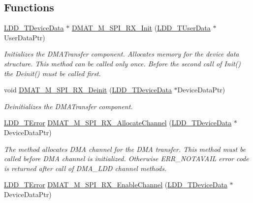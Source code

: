 \subsection*{Functions}
\begin{DoxyCompactItemize}
\item 
\hyperlink{group___p_e___types__module_gac5cf1362f1f0e3a2ce71b1bf2276d091}{L\-D\-D\-\_\-\-T\-Device\-Data} $\ast$ \hyperlink{group___d_m_a_t___m___s_p_i___r_x__module_gae1749563cbec6c79815508b3c37ba827}{D\-M\-A\-T\-\_\-\-M\-\_\-\-S\-P\-I\-\_\-\-R\-X\-\_\-\-Init} (\hyperlink{group___p_e___types__module_ga0b66a73f87238a782318aa0be7578e35}{L\-D\-D\-\_\-\-T\-User\-Data} $\ast$User\-Data\-Ptr)
\begin{DoxyCompactList}\small\item\em Initializes the D\-M\-A\-Transfer component. Allocates memory for the device data structure. This method can be called only once. Before the second call of Init() the Deinit() must be called first. \end{DoxyCompactList}\item 
void \hyperlink{group___d_m_a_t___m___s_p_i___r_x__module_ga9de8df48ffcbfc74c12902bd2caeda53}{D\-M\-A\-T\-\_\-\-M\-\_\-\-S\-P\-I\-\_\-\-R\-X\-\_\-\-Deinit} (\hyperlink{group___p_e___types__module_gac5cf1362f1f0e3a2ce71b1bf2276d091}{L\-D\-D\-\_\-\-T\-Device\-Data} $\ast$Device\-Data\-Ptr)
\begin{DoxyCompactList}\small\item\em Deinitializes the D\-M\-A\-Transfer component. \end{DoxyCompactList}\item 
\hyperlink{group___p_e___types__module_ga24c2b045fd04e79e85f261ce4df35588}{L\-D\-D\-\_\-\-T\-Error} \hyperlink{group___d_m_a_t___m___s_p_i___r_x__module_ga94c354d7c7c0b56a1aed784fcb0e3d77}{D\-M\-A\-T\-\_\-\-M\-\_\-\-S\-P\-I\-\_\-\-R\-X\-\_\-\-Allocate\-Channel} (\hyperlink{group___p_e___types__module_gac5cf1362f1f0e3a2ce71b1bf2276d091}{L\-D\-D\-\_\-\-T\-Device\-Data} $\ast$Device\-Data\-Ptr)
\begin{DoxyCompactList}\small\item\em The method allocates D\-M\-A channel for the D\-M\-A transfer. This method must be called before D\-M\-A channel is initialized. Otherwise E\-R\-R\-\_\-\-N\-O\-T\-A\-V\-A\-I\-L error code is returned after call of D\-M\-A\-\_\-\-L\-D\-D channel methods. \end{DoxyCompactList}\item 
\hyperlink{group___p_e___types__module_ga24c2b045fd04e79e85f261ce4df35588}{L\-D\-D\-\_\-\-T\-Error} \hyperlink{group___d_m_a_t___m___s_p_i___r_x__module_gafc57e74b4003c05c870480ab0c3a8432}{D\-M\-A\-T\-\_\-\-M\-\_\-\-S\-P\-I\-\_\-\-R\-X\-\_\-\-Enable\-Channel} (\hyperlink{group___p_e___types__module_gac5cf1362f1f0e3a2ce71b1bf2276d091}{L\-D\-D\-\_\-\-T\-Device\-Data} $\ast$Device\-Data\-Ptr)

\end{DoxyCompactItemize}
